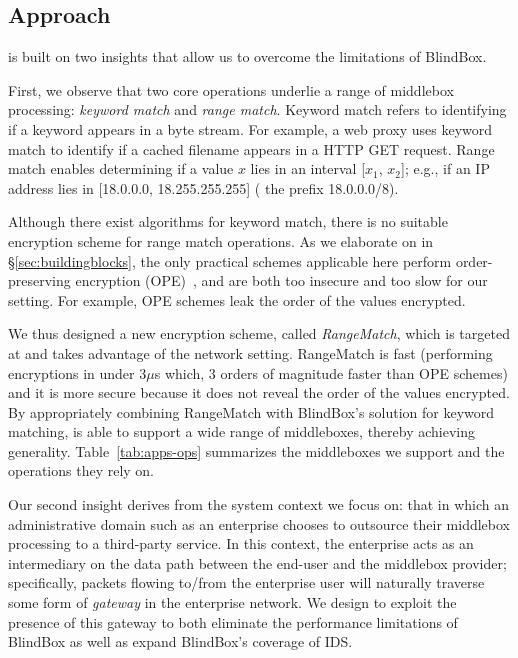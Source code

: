 
\subsection{Approach} 
\label{sec:approach}
\sys is built on two insights that allow us to overcome the limitations of BlindBox.  

First, we observe that two core operations underlie a range of middlebox processing: {\em keyword match} and {\em range match}. Keyword match refers to identifying if 
a keyword appears in a byte stream. For example, a web proxy uses keyword match to identify if a cached filename appears in a HTTP GET request. 
Range match enables determining if a value $x$ lies in an interval [$x_1$, $x_2$]; e.g., if an IP address lies in [18.0.0.0, 18.255.255.255] (\ie{} the 
prefix 18.0.0.0/8). 

Although there exist algorithms for keyword match, there is no suitable encryption scheme for range match operations.  
As we elaborate on in \S\ref{sec:buildingblocks}, the only practical schemes applicable here perform order-preserving encryption (OPE)~\cite{boldyreva:ope,popa:mope}, and 
are both too insecure and too slow for our setting. For example, OPE schemes leak the order of the values encrypted. 

We thus designed a new encryption scheme, called {\em RangeMatch}, which is targeted at and takes advantage of the network setting. 
RangeMatch is fast (performing encryptions in under 3$\mu$s which, 3 orders of magnitude faster than OPE schemes) and it is more secure because 
it does not reveal the order of the values encrypted. 
By appropriately combining RangeMatch with BlindBox's solution for keyword matching, \sys is able to support a wide range of middleboxes, thereby 
achieving generality. Table~\ref{tab:apps-ops} summarizes the middleboxes we support and the operations they rely on. 

Our second insight derives from the system context we focus on: 
that in which an administrative domain such as an enterprise chooses to outsource their middlebox processing to a third-party service. 
In this context, the enterprise acts as an intermediary on the data path between the end-user and the middlebox provider; 
specifically, packets flowing to/from the enterprise user will naturally traverse some form of \emph{gateway} in the enterprise network. 
We design \sys to exploit the presence of this gateway to both eliminate the performance limitations of BlindBox as well as 
expand BlindBox's coverage of IDS.

